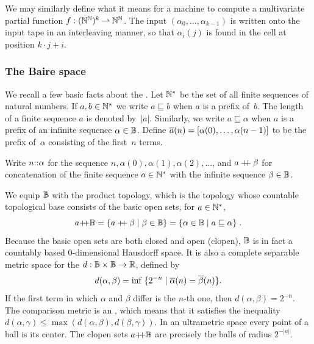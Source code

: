 We may similarly define what it means for a machine to compute a multivariate partial function $f : (\mathbb{N}^{\mathbb{N}})^k \mathbin{\rightharpoonup} \mathbb{N}^{\mathbb{N}}$. The input $(\alpha_0, \ldots, \alpha_{k-1})$ is written onto the input tape in an interleaving manner, so that $\alpha_i(j)$ is found in the cell at position $k \cdot j + i$.

\subsubsection{The Baire space}
\label{sec:baire-space}

We recall a few basic facts about the . Let $\mathbb{N}^{*}$ be the set of all finite sequences of natural numbers. If $a, b \in \mathbb{N}^{*}$
we write $a \sqsubseteq b$ when $a$ is a prefix of~$b$. The length of a finite sequence $a$ is denoted by~$|a|$. Similarly, we write $a \sqsubseteq \alpha$ when $a$ is a prefix of an infinite sequence $\alpha \in \mathbb{B}$. Define $\overline{a}(n) = [\alpha(0), \ldots,
\alpha(n-1)]$ to be the prefix of~$\alpha$ consisting of the first~$n$ terms.

Write $n {:}{:} \alpha$ for the sequence $n, \alpha(0), \alpha(1), \alpha(2), \ldots$, and $a \mathbin{{+}\!\!{+}} \beta$ for concatenation of the finite sequence $a \in \mathbb{N}^{*}$ with the infinite sequence $\beta \in \mathbb{B}$.

We equip $\mathbb{B}$ with the product topology, which is the topology whose countable topological base consists of the basic open sets, for $a \in \mathbb{N}^{*}$,
%
\begin{equation*}
  a{{+}\!\!{+}}\mathbb{B}
  = \{a \mathbin{{+}\!\!{+}} \beta \mid \beta \in \mathbb{B}\}
  = \{\alpha \in \mathbb{B} \mid a \sqsubseteq \alpha\}
  \;.
\end{equation*}
%
Because the basic open sets are both closed and open (clopen),
$\mathbb{B}$ is in fact a countably based $0$-dimensional Hausdorff space. It is also a complete
separable metric space for the  $d : \mathbb{B}
\times \mathbb{B} \to \mathbb{R}$, defined by
%
\begin{equation*}
  d(\alpha, \beta) = \inf \;\{2^{-n} \mid
    \overline{\alpha}(n) = \overline{\beta}(n)\}.
\end{equation*}
%
If the first term in which $\alpha$ and $\beta$ differ is the $n$-th
one, then $d(\alpha, \beta) = 2^{-n}$. The comparison metric is an
, which means that it satisfies the inequality $d(\alpha,
\gamma) \leq \max(d(\alpha, \beta), d(\beta, \gamma))$. In an ultrametric space every point of a ball is its center. The clopen sets $a{{+}\!\!{+}}\mathbb{B}$ are precisely the balls of radius $2^{-|a|}$.

